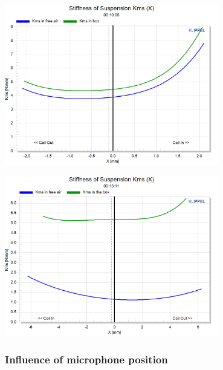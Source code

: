 \documentclass{report}
\begin{document}
\begin{appendices}
\begin{minipage}{0.5\textwidth}
\begin{center}
	\includegraphics[width=0.7\textwidth]{RoomComp/Kms_10cm} 
    \captionsetup{hypcap=false} 
	\label{fig:kms10}
\end{center}
\end{minipage}
\begin{minipage}{0.5\textwidth}
\begin{center}
	\includegraphics[width=0.7\textwidth]{RoomComp/Kms_12cm} 
    \captionsetup{hypcap=false} 
	\label{fig:kms12}
\end{center}
\end{minipage}
\vspace{0.1cm}

\subsubsection{Influence of microphone position}
\label{Curves:InfluMicPos}



\end{appendices}
\end{document}
